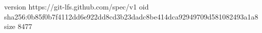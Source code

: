 version https://git-lfs.github.com/spec/v1
oid sha256:0b85f0b7f4112dd6e922dd8cd3b23dadc8be414dca92949709d581082493a1a8
size 8477
